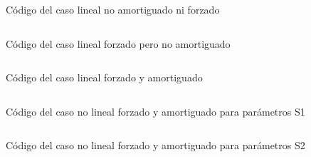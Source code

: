 \documentclass[11pt]{article}
\begin{document}
\begin{figure}
\inputminted[linenos]{python}{../caso_forzado.py}
\caption{Código del caso lineal no amortiguado ni forzado}
\end{figure}

\begin{figure}
\inputminted[linenos]{python}{../caso_forzado.py}
\caption{Código del caso lineal forzado pero no amortiguado}
\end{figure}

\begin{figure}
\inputminted[linenos]{python}{../caso_forzado_amortiguado.py}
\caption{Código del caso lineal forzado y amortiguado}
\end{figure}

\begin{figure}
\inputminted[linenos]{python}{../caso_anarmonico_forzado_amortiguado_s1.py}
\caption{Código del caso no lineal forzado y amortiguado para parámetros S1}
\end{figure}

\begin{figure}
\inputminted[linenos]{python}{../caso_anarmonico_forzado_amortiguado_s2.py}
\caption{Código del caso no lineal forzado y amortiguado para parámetros S2}
\end{figure}
\end{document}
